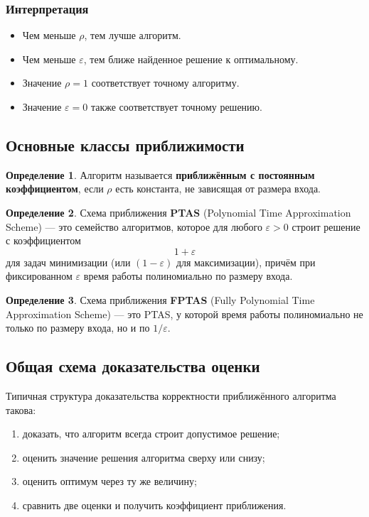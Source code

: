 \documentclass[12pt,a4paper]{article}
\theoremstyle{definition}
\newtheorem{definition}{Определение}[section]
\theoremstyle{plain}
\begin{document}
\subsubsection{Интерпретация}
\begin{itemize}
\item Чем меньше $\rho$, тем лучше алгоритм.
\item Чем меньше $\varepsilon$, тем ближе найденное решение к оптимальному.
\item Значение $\rho=1$ соответствует точному алгоритму.
\item Значение $\varepsilon=0$ также соответствует точному решению.
\end{itemize}

\subsection{Основные классы приближимости}

\begin{definition}
Алгоритм называется \textbf{приближённым с постоянным коэффициентом}, если $\rho$ есть константа, не зависящая от размера входа.
\end{definition}

\begin{definition}
Схема приближения \textbf{PTAS} (Polynomial Time Approximation Scheme) --- это семейство алгоритмов, которое для любого $\varepsilon>0$ строит решение с коэффициентом
\[
1+\varepsilon
\]
для задач минимизации (или $(1-\varepsilon)$ для максимизации), причём при фиксированном $\varepsilon$ время работы полиномиально по размеру входа.
\end{definition}

\begin{definition}
Схема приближения \textbf{FPTAS} (Fully Polynomial Time Approximation Scheme) --- это PTAS, у которой время работы полиномиально не только по размеру входа, но и по $1/\varepsilon$.
\end{definition}

\subsection{Общая схема доказательства оценки}
Типичная структура доказательства корректности приближённого алгоритма такова:
\begin{enumerate}
\item доказать, что алгоритм всегда строит допустимое решение;
\item оценить значение решения алгоритма сверху или снизу;
\item оценить оптимум через ту же величину;
\item сравнить две оценки и получить коэффициент приближения.
\end{enumerate}
\end{document}
